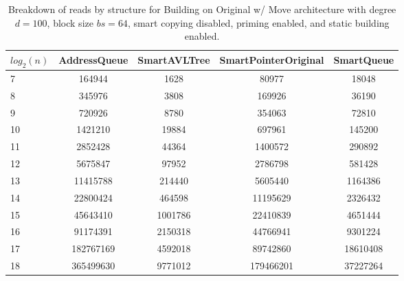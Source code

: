 \begin{table}[]
\centering
\begin{tabular}{|l|c|c|c|c|}
$log_2(n)$ & AddressQueue & SmartAVLTree & SmartPointerOriginal & SmartQueue \\ \hline
7 & 164944 & 1628 & 80977 & 18048 \\ \hline
8 & 345976 & 3808 & 169926 & 36190 \\ \hline
9 & 720926 & 8780 & 354063 & 72810 \\ \hline
10 & 1421210 & 19884 & 697961 & 145200 \\ \hline
11 & 2852428 & 44364 & 1400572 & 290892 \\ \hline
12 & 5675847 & 97952 & 2786798 & 581428 \\ \hline
13 & 11415788 & 214440 & 5605440 & 1164386 \\ \hline
14 & 22800424 & 464598 & 11195629 & 2326432 \\ \hline
15 & 45643410 & 1001786 & 22410839 & 4651444 \\ \hline
16 & 91174391 & 2150318 & 44766941 & 9301224 \\ \hline
17 & 182767169 & 4592018 & 89742860 & 18610408 \\ \hline
18 & 365499630 & 9771012 & 179466201 & 37227264 \\ \hline
\end{tabular}
\caption{Breakdown of reads by structure for Building on Original w/ Move architecture with degree $d=100$, block size $bs=64$, smart copying disabled, priming enabled, and static building enabled.}
    \label{tab:reads_by_structure_build_d100_bs64_copiesfalse_primetrue_staticinsertiontrue_ptoriginal_movetrue}
\end{table}

